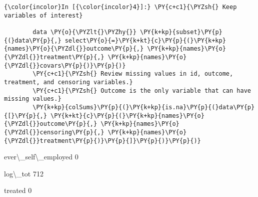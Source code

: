    \begin{Verbatim}[commandchars=\\\{\}]
{\color{incolor}In [{\color{incolor}4}]:} \PY{c+c1}{\PYZsh{} Keep variables of interest}
        
        data \PY{o}{\PYZlt{}\PYZhy{}} \PY{k+kp}{subset}\PY{p}{(}data\PY{p}{,} select\PY{o}{=}\PY{k+kt}{c}\PY{p}{(}\PY{k+kp}{names}\PY{o}{\PYZdl{}}outcome\PY{p}{,} \PY{k+kp}{names}\PY{o}{\PYZdl{}}treatment\PY{p}{,} \PY{k+kp}{names}\PY{o}{\PYZdl{}}covars\PY{p}{)}\PY{p}{)}
        \PY{c+c1}{\PYZsh{} Review missing values in id, outcome, treatment, and censoring variables.}
        \PY{c+c1}{\PYZsh{} Outcome is the only variable that can have missing values.}
        \PY{k+kp}{colSums}\PY{p}{(}\PY{k+kp}{is.na}\PY{p}{(}data\PY{p}{[}\PY{p}{,} \PY{k+kt}{c}\PY{p}{(}\PY{k+kp}{names}\PY{o}{\PYZdl{}}outcome\PY{p}{,} \PY{k+kp}{names}\PY{o}{\PYZdl{}}censoring\PY{p}{,} \PY{k+kp}{names}\PY{o}{\PYZdl{}}treatment\PY{p}{)}\PY{p}{]}\PY{p}{)}\PY{p}{)}
\end{Verbatim}


    \begin{description*}
\item[ever\textbackslash{}\_self\textbackslash{}\_employed] 0
\item[log\textbackslash{}\_tot] 712
\item[treated] 0
\end{description*}


 
